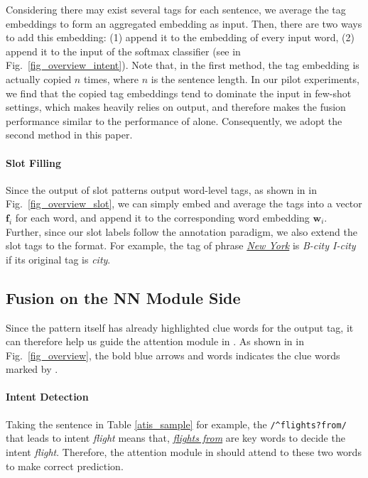 Considering there may exist several \RE tags for each sentence, we average the tag embeddings to form an aggregated embedding as input.
Then, there are two ways to add this embedding: (1) append it to the embedding of every input word, (2) append it to the input of the softmax classifier (see  in Fig.~\ref{fig_overview_intent}).
Note that, in the first method, the tag embedding is actually copied $n$ times, where $n$ is the sentence length.
In our pilot experiments, we find that the copied tag embeddings tend to dominate the input in few-shot settings, which makes \NN heavily relies on \RE output, and therefore makes the fusion performance similar to the performance of \RE alone. Consequently, we adopt the second method in this paper.

\paragraph{Slot Filling}
Since the output of slot \RE patterns output word-level tags, as shown in  in Fig.~\ref{fig_overview_slot}, we can simply embed
and average the \RE tags into a vector $\textbf{f}_i$ for each word, and append it to the corresponding word embedding $\textbf{w}_i$.
Further, since our slot labels follow the \BIO annotation paradigm, we also extend the slot \RE tags to the \BIO format. For example, the
\RE tag of phrase \textsl{\underline{New York}} is \emph{B-city I-city} if its original tag is \emph{city}.

\subsection{Fusion on the NN Module Side}
\label{interact_with_module}
Since the \RE pattern itself has already highlighted clue words for the output tag, it can therefore help us guide the attention module in \NN.
As shown in  in Fig.~\ref{fig_overview}, the bold blue arrows and words indicates the clue words marked by \RE.
\paragraph{Intent Detection}
Taking the sentence in Table \ref{atis_sample} for example, the \RE \texttt{/\textasciicircum flights?\:from/} that leads to intent \emph{flight} means that, \textsl{\underline{flights from}} are key words to decide the intent \emph{flight}. Therefore, the attention module in \NN should attend to these two words to make correct prediction.

